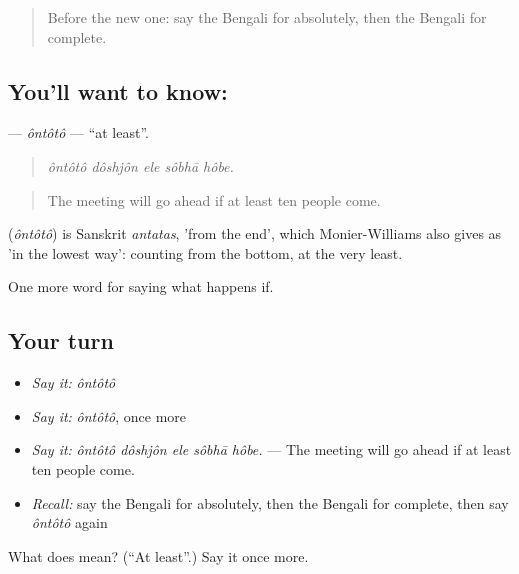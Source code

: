 \begin{quote}
Before the new one: say the Bengali for absolutely, then the Bengali for complete.
\end{quote}

\subsection*{You'll want to know: }
\textbf{} — \emph{ôntôtô} — \textquotedblleft{}at least\textquotedblright{}.

\begin{quote}
    
\end{quote}

\begin{quote}
\emph{ôntôtô dôshjôn ele sôbhā hôbe.}
\end{quote}

\begin{quote}
The meeting will go ahead if at least ten people come.
\end{quote}

\begin{cousinweb}
\textbf{} (\emph{ôntôtô}) is Sanskrit \emph{antatas}, 'from the end', which Monier-Williams also gives as 'in the lowest way': counting from the bottom, at the very least.
\end{cousinweb}

\begin{grammarlens}[title={What you've built}]
One more word for saying what happens if.
\end{grammarlens}

\subsection*{Your turn}
\begin{itemize}
\raggedright
  \item \emph{Say it:} \emph{ôntôtô}
  \item \emph{Say it:} \emph{ôntôtô}, once more
  \item \emph{Say it:} \emph{ôntôtô dôshjôn ele sôbhā hôbe.} — The meeting will go ahead if at least ten people come.
  \item \emph{Recall:} say the Bengali for absolutely, then the Bengali for complete, then say \emph{ôntôtô} again
\end{itemize}

\begin{tcolorbox}[breakable,colback=teal!4,colframe=teal!35!black,title={Before you move on}]
What does  mean? (\textquotedblleft{}At least\textquotedblright{}.) Say it once more.
\end{tcolorbox}
